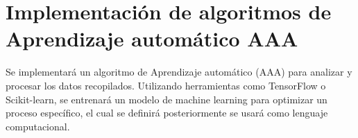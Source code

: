 \section{Implementación de algoritmos de Aprendizaje automático AAA}

Se implementará un algoritmo de Aprendizaje automático (AAA) para analizar y procesar los datos recopilados. Utilizando herramientas como TensorFlow o Scikit-learn, se entrenará un modelo de machine learning para optimizar un proceso específico, el cual se definirá posteriormente  se usará como lenguaje computacional.
